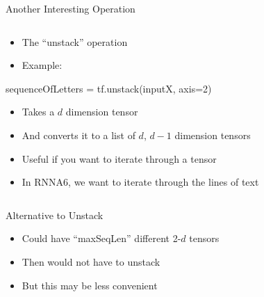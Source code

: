 \documentclass[aspectratio=169]{beamer}
\begin{document}
\begin{frame}[fragile]{Another Interesting Operation}

\begin{columns}[b]
\begin{column}{0.6\textwidth}
\begin{itemize}
\item The ``unstack'' operation
\item Example:
\end{itemize}
        \begin{SQL}
sequenceOfLetters = tf.unstack(inputX, axis=2)
        \end{SQL}
        \begin{itemize}
        \item Takes a $d$ dimension tensor 
	\item And converts it to a list of $d$, $d-1$ dimension tensors
	\item Useful if you want to iterate through a tensor
        \item In RNNA6, we want to iterate through the lines of text
        \end{itemize}
\end{column}
\begin{column}{0.4\textwidth}
\end{column}
\end{columns}

\end{frame}
\begin{frame}[fragile]{Alternative to Unstack}

\begin{itemize}
\item Could have ``maxSeqLen'' different 2-$d$ tensors
\item Then would not have to unstack
\item But this may be less convenient
\end{itemize}

\end{frame}
\end{document}
